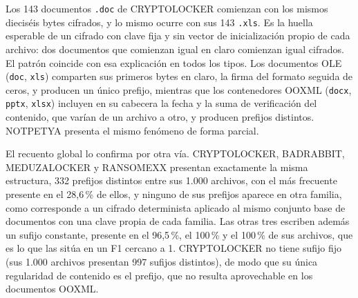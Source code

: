 \begin{table}[ht]
\centering
\caption{Prefijos de dieciséis bytes por tipo de documento, expresados como archivos / prefijos distintos. Un único prefijo para todos los archivos de un tipo indica cifrado determinista. Base: conjunto completo, 29.948 archivos, sin aprendizaje.}
\label{tab:prefijos_tipo}
\end{table}

Los 143 documentos \texttt{.doc} de CRYPTOLOCKER comienzan con los mismos dieciséis bytes cifrados, y lo mismo ocurre con sus 143 \texttt{.xls}. Es la huella esperable de un cifrado con clave fija y sin vector de inicialización propio de cada archivo: dos documentos que comienzan igual en claro comienzan igual cifrados. El patrón coincide con esa explicación en todos los tipos. Los documentos OLE (\texttt{doc}, \texttt{xls}) comparten sus primeros bytes en claro, la firma del formato seguida de ceros, y producen un único prefijo, mientras que los contenedores OOXML (\texttt{docx}, \texttt{pptx}, \texttt{xlsx}) incluyen en su cabecera la fecha y la suma de verificación del contenido, que varían de un archivo a otro, y producen prefijos distintos. NOTPETYA presenta el mismo fenómeno de forma parcial.

El recuento global lo confirma por otra vía. CRYPTOLOCKER, BADRABBIT, MEDUZALOCKER y RANSOMEXX presentan exactamente la misma estructura, 332 prefijos distintos entre sus 1.000 archivos, con el más frecuente presente en el 28,6\,\% de ellos, y ninguno de sus prefijos aparece en otra familia, como corresponde a un cifrado determinista aplicado al mismo conjunto base de documentos con una clave propia de cada familia. Las otras tres escriben además un sufijo constante, presente en el 96,5\,\%, el 100\,\% y el 100\,\% de sus archivos, que es lo que las sitúa en un F1 cercano a 1. CRYPTOLOCKER no tiene sufijo fijo (sus 1.000 archivos presentan 997 sufijos distintos), de modo que su única regularidad de contenido es el prefijo, que no resulta aprovechable en los documentos OOXML.

